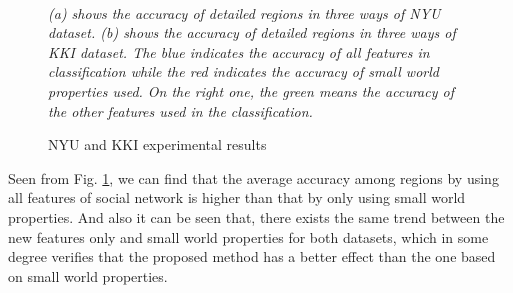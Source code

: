 \documentclass{llncs}
\begin{document}
\begin{figure}[!htbp]
	\centering
    \\
	\caption{NYU and KKI experimental results}
    \label{fig:2}	
\begin{flushleft}
\emph{(a) shows the accuracy of detailed regions in three ways of NYU dataset. (b) shows the accuracy of detailed regions in three ways of KKI dataset. The blue indicates the accuracy of all features in classification while the red indicates the accuracy of small world properties used. On the right one, the green means the accuracy of the other features used in the classification.}
\end{flushleft}
    	
\end{figure}


Seen from Fig. \ref{fig:2}, we can find that the average accuracy among regions by using all features of social network is higher than that by only using small world properties. And also it can be seen that, there exists the same trend between the new features only and small world properties for both datasets, which in some degree verifies that the proposed method has a better effect than the one based on small world properties.
\end{document}
